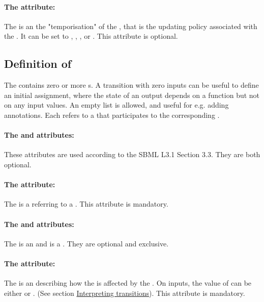 \paragraph{The  attribute:}
The  is an  the "temporisation" of the , that is the updating policy associated with the . It can be set to , , ,  or .
This attribute is optional. 

\bigskip
\subsection*{Definition of } %
The  contains zero or more s. A transition with zero inputs can be useful to define an initial assignment, where the state of an output depends on a function but not on any input values. An empty list is allowed, and useful for e.g. adding annotations.
Each  refers to a  that participates to the corresponding .

\paragraph{The  and  attributes:}
 These attributes are used according to the SBML L3.1 Section 3.3. They are both optional.

\paragraph{The  attribute:}
The  is a  referring to a . This attribute is mandatory.

\paragraph{The  and  attributes:}
The  is an  and  is a . They are optional and exclusive.

\paragraph{The  attribute:}
The  is an  describing how the  is affected by the . On inputs, the value of  can be either  or . (See section \hyperlink{inter_trans}{Interpreting transitions}). This attribute is mandatory.

